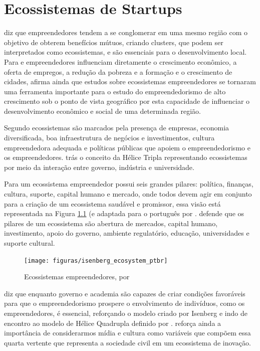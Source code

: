 \chapter[Ecossistemas de Startups]{Ecossistemas de Startups}
\label{cap-sobre-a-proposta-e-a-metodologia}

 diz que empreendedores tendem a se conglomerar em uma mesmo região com o objetivo de obterem benefícios mútuos, criando clusters, que podem ser interpretados como ecossistemas, e são essenciais para o desenvolvimento local. Para  e  empreendedores influenciam diretamente o crescimento econômico, a oferta de empregos, a redução da pobreza e a formação e o crescimento de cidades,  afirma ainda que estudos sobre ecossistemas empreendedores se tornaram uma ferramenta importante para o estudo do empreendedorismo de alto crescimento sob o ponto de vista geográfico por esta capacidade de influenciar o desenvolvimento econômico e social de uma determinada região.

Segundo  ecossistemas são marcados pela presença de empresas, economia diversificada, boa infraestrutura de negócios e investimentos, cultura empreendedora adequada e políticas públicas que apoiem o empreendedorismo e os empreendedores.  trás o conceito da Hélice Tripla representando ecossistemas por meio da interação entre governo, indústria e universidade.

Para  um ecossistema empreendedor possui seis grandes pilares: política, finanças, cultura, suporte, capital humano e mercado, onde todos devem agir em conjunto para a criação de um ecossistema saudável e promissor, essa visão está representada na Figura \ref{figure:isenberg_ecosystem} (e adaptada para o português por .  defende que os pilares de um ecossistema são abertura de mercados, capital humano, investimento, apoio do governo, ambiente regulatório, educação, universidades e suporte cultural.

\begin{figure}[!htb]
\centering
\texttt{[image: figuras/isenberg\_ecosystem\_ptbr]}
\caption{Ecossistemas empreendedores, por }
\label{figure:isenberg_ecosystem}
\end{figure}

 diz que enquanto governo e academia são capazes de criar condições favoráveis para que o empreendedorismo prospere o envolvimento de indivíduos, como os empreendedores, é essencial, reforçando o modelo criado por Isenberg e indo de encontro ao modelo de Hélice Quadrupla definido por .  reforça ainda a importância de considerarmos mídia e cultura como variáveis que compõem essa quarta vertente que representa a sociedade civil em um ecossistema de inovação.

